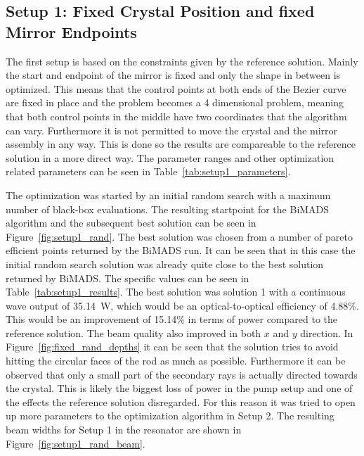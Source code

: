 \documentclass[a4paper,10pt]{article}
\newcommand{\figref}[1]{Figure~\ref{#1}}
\newcommand{\tabref}[1]{Table~\ref{#1}}
\begin{document}
    \subsection{Setup 1: Fixed Crystal Position and fixed Mirror Endpoints}
    
    The first setup is based on the constraints given by the reference
    solution.
    Mainly the start and endpoint of the mirror is fixed and only the shape
    in between is optimized.
    This means that the control points at both ends of the Bezier curve
    are fixed in place and the problem becomes a 4 dimensional problem,
    meaning that both control points in the middle have two coordinates
    that the algorithm can vary.
    Furthermore it is not permitted to move the crystal and the mirror
    assembly in any way.
    This is done so the results are compareable to the reference solution
    in a more direct way.
    The parameter ranges and other optimization related parameters can be
    seen in \tabref{tab:setup1_parameters}.
    
    The optimization was started by an initial random search with a 
    maximum number of black-box evaluations.
    The resulting startpoint for the BiMADS algorithm and the
    subsequent best solution can be seen in \figref{fig:setup1_rand}.
    The best solution was chosen from a number of pareto efficient
    points returned by the BiMADS run.
    It can be seen that in this case the initial random search solution
    was already quite close to the best solution returned by BiMADS.
    The specific values can be seen in \tabref{tab:setup1_results}.
    The best solution was solution 1 with a continuous wave output
    of \SI{35.14}{W}, which would be an optical-to-optical 
    efficiency of 4.88\%.
    This would be an improvement of 15.14\% in terms of power compared
    to the reference solution.
    The beam quality also improved in both $x$ and $y$ direction.
    In \figref{fig:fixed_rand_depths} it can be seen that the solution
    tries to avoid hitting the circular faces of the rod as much as
    possible.
    Furthermore it can be observed that only a small part of the secondary
    rays is actually directed towards the crystal.
    This is likely the biggest loss of power in the pump setup and one of
    the effects the reference solution disregarded.
    For this reason it was tried to open up more parameters to the
    optimization algorithm in Setup 2.
    The resulting beam widths for Setup 1 in the resonator are shown in
    \figref{fig:setup1_rand_beam}. 
\end{document}

